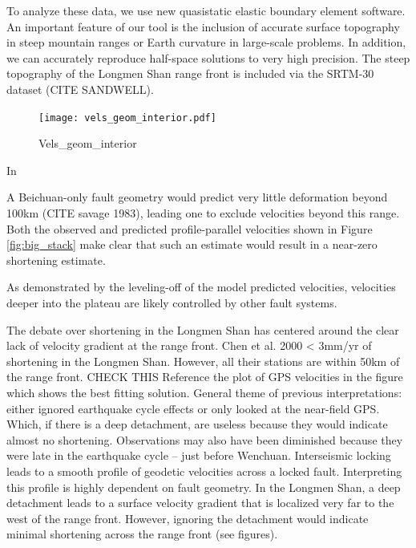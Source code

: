 \documentclass{article}
\begin{document}
To analyze these data, we use new quasistatic elastic boundary element software. An important feature of our tool is the inclusion of accurate surface topography in steep mountain ranges or Earth curvature in large-scale problems. In addition, we can accurately reproduce half-space solutions to very high precision. The steep topography of the Longmen Shan range front is included via the SRTM-30 dataset (CITE SANDWELL).

\begin{figure}[h!]
    \centering
    \texttt{[image: vels\_geom\_interior.pdf]}
    \caption{Vels_geom_interior}
    \label{fig:vels_geom_interior}
\end{figure}
In 

A Beichuan-only fault geometry would predict very little deformation beyond 100km (CITE savage 1983), leading one to exclude velocities beyond this range. Both the observed and predicted profile-parallel velocities shown in Figure \ref{fig:big_stack} make clear that such an estimate would result in a near-zero shortening estimate.

As demonstrated by the leveling-off of the model predicted velocities, velocities deeper into the plateau are likely controlled by other fault systems.

The debate over shortening in the Longmen Shan has centered around the clear lack of velocity gradient at the range front. 
Chen et al. 2000 < 3mm/yr of shortening in the Longmen Shan.
However, all their stations are within 50km of the range front. CHECK THIS
Reference the plot of GPS velocities in the figure which shows the best fitting solution.
General theme of previous interpretations: either ignored earthquake cycle effects or only looked at the near-field GPS.
Which, if there is a deep detachment, are useless because they would indicate almost no shortening.
Observations may also have been diminished because they were late in the earthquake cycle – just before Wenchuan.
Interseismic locking leads to a smooth profile of geodetic velocities across a locked fault.
Interpreting this profile is highly dependent on fault geometry.
In the Longmen Shan, a deep detachment leads to a surface velocity gradient that is localized very far to the west of the range front.
However, ignoring the detachment would indicate minimal shortening across the range front (see figures).
\end{document}

